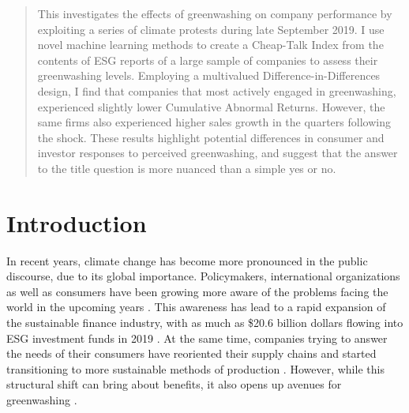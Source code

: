 \documentclass[12pt]{article}
\author{Your Name}
\date{Date of submission: \today}
\begin{document}

\pagebreak
{}

\begin{abstract}
This investigates the effects of greenwashing on company performance by exploiting a series of climate protests during late September 2019. I use novel machine learning methods to create a Cheap-Talk Index from the contents of ESG reports of a large sample of companies to assess their greenwashing levels. Employing a multivalued Difference-in-Differences design, I find that companies that most actively engaged in greenwashing, experienced slightly lower Cumulative Abnormal Returns. However, the same firms also experienced higher sales growth in the quarters following the shock. These results highlight potential differences in consumer and investor responses to perceived greenwashing, and suggest that the answer to the title question is more nuanced than a simple yes or no.  

\end{abstract}
\pagebreak

\tableofcontents
\listoffigures
\listoftables
\pagebreak

\setcounter{page}{1}

\section{Introduction}\label{sect:introduction}

In recent years, climate change has become more pronounced in the public discourse, due to its global importance. Policymakers, international organizations as well as consumers have been growing more aware of the problems facing the world in the upcoming years \parencite{pew2022climate}. This awareness has lead to a rapid expansion of the sustainable finance industry, with as much as \$20.6 billion dollars flowing into ESG investment funds in 2019 \parencite{hale2020sustainable}. At the same time, companies trying to answer the needs of their consumers have reoriented their supply chains and started transitioning to more sustainable methods of production \parencite{pwc2023supplychain, pwc2023sustainability}. However, while this structural shift can bring about benefits, it also opens up avenues for greenwashing \parencite{villenaMoreSustainableSupply2020}.
\end{document}
